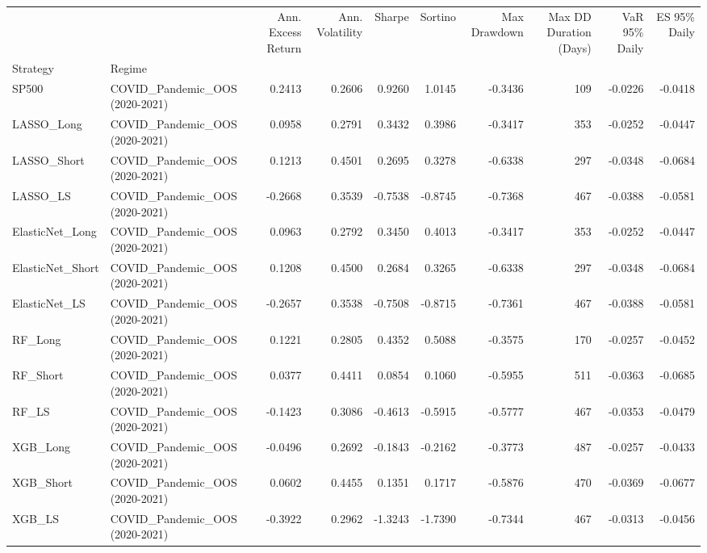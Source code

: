 \begin{tabular}{llrrrrrrrr}
\toprule
 &  & Ann. Excess Return & Ann. Volatility & Sharpe & Sortino & Max Drawdown & Max DD Duration (Days) & VaR 95\% Daily & ES 95\% Daily \\
Strategy & Regime &  &  &  &  &  &  &  &  \\
\midrule
SP500 & COVID\_Pandemic\_OOS (2020-2021) & 0.2413 & 0.2606 & 0.9260 & 1.0145 & -0.3436 & 109 & -0.0226 & -0.0418 \\
\cline{1-10}
LASSO\_Long & COVID\_Pandemic\_OOS (2020-2021) & 0.0958 & 0.2791 & 0.3432 & 0.3986 & -0.3417 & 353 & -0.0252 & -0.0447 \\
\cline{1-10}
LASSO\_Short & COVID\_Pandemic\_OOS (2020-2021) & 0.1213 & 0.4501 & 0.2695 & 0.3278 & -0.6338 & 297 & -0.0348 & -0.0684 \\
\cline{1-10}
LASSO\_LS & COVID\_Pandemic\_OOS (2020-2021) & -0.2668 & 0.3539 & -0.7538 & -0.8745 & -0.7368 & 467 & -0.0388 & -0.0581 \\
\cline{1-10}
ElasticNet\_Long & COVID\_Pandemic\_OOS (2020-2021) & 0.0963 & 0.2792 & 0.3450 & 0.4013 & -0.3417 & 353 & -0.0252 & -0.0447 \\
\cline{1-10}
ElasticNet\_Short & COVID\_Pandemic\_OOS (2020-2021) & 0.1208 & 0.4500 & 0.2684 & 0.3265 & -0.6338 & 297 & -0.0348 & -0.0684 \\
\cline{1-10}
ElasticNet\_LS & COVID\_Pandemic\_OOS (2020-2021) & -0.2657 & 0.3538 & -0.7508 & -0.8715 & -0.7361 & 467 & -0.0388 & -0.0581 \\
\cline{1-10}
RF\_Long & COVID\_Pandemic\_OOS (2020-2021) & 0.1221 & 0.2805 & 0.4352 & 0.5088 & -0.3575 & 170 & -0.0257 & -0.0452 \\
\cline{1-10}
RF\_Short & COVID\_Pandemic\_OOS (2020-2021) & 0.0377 & 0.4411 & 0.0854 & 0.1060 & -0.5955 & 511 & -0.0363 & -0.0685 \\
\cline{1-10}
RF\_LS & COVID\_Pandemic\_OOS (2020-2021) & -0.1423 & 0.3086 & -0.4613 & -0.5915 & -0.5777 & 467 & -0.0353 & -0.0479 \\
\cline{1-10}
XGB\_Long & COVID\_Pandemic\_OOS (2020-2021) & -0.0496 & 0.2692 & -0.1843 & -0.2162 & -0.3773 & 487 & -0.0257 & -0.0433 \\
\cline{1-10}
XGB\_Short & COVID\_Pandemic\_OOS (2020-2021) & 0.0602 & 0.4455 & 0.1351 & 0.1717 & -0.5876 & 470 & -0.0369 & -0.0677 \\
\cline{1-10}
XGB\_LS & COVID\_Pandemic\_OOS (2020-2021) & -0.3922 & 0.2962 & -1.3243 & -1.7390 & -0.7344 & 467 & -0.0313 & -0.0456 \\

\end{tabular}
